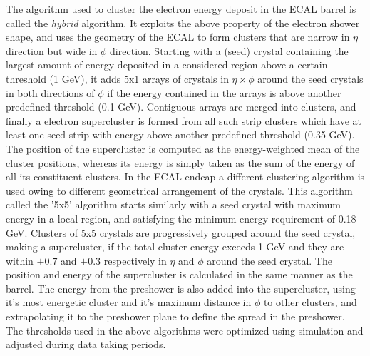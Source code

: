 The algorithm used to cluster the electron energy deposit in the ECAL barrel is called the \textit{hybrid} algorithm. It exploits the above property of the electron shower shape, and uses the geometry of the ECAL to form clusters that are narrow in $\eta$ direction but wide in $\phi$ direction. Starting with a (seed) crystal containing the largest amount of energy deposited in a considered region above a certain threshold (1 GeV), it adds 5x1 arrays of crystals in $\eta\times\phi$ around the seed crystals in both directions of $\phi$ if the energy contained in the arrays is above another predefined threshold (0.1 GeV). Contiguous arrays are merged into clusters, and finally a electron supercluster is formed from all such strip clusters which have at least one seed strip with energy above another predefined threshold (0.35 GeV). The position of the supercluster is computed as the energy-weighted mean of the cluster positions, whereas its energy is simply taken as the sum of the energy of all its constituent clusters. In the ECAL endcap a different clustering algorithm is used owing to different geometrical arrangement of the crystals. This algorithm called the '5x5' algorithm starts similarly with a seed crystal with maximum energy in a local region, and satisfying the minimum energy requirement of 0.18 GeV. Clusters of 5x5 crystals are progressively grouped around the seed crystal, making a supercluster, if the total cluster energy exceeds 1 GeV and they are within $\pm 0.7$  and $\pm 0.3$ respectively in $\eta$ and $\phi$ around the seed crystal. The position and energy of the supercluster is calculated in the same manner as the barrel. The energy from the preshower is also added into the supercluster, using it's most energetic cluster and it's maximum distance in $\phi$ to other clusters, and extrapolating it to the preshower plane to define the spread in the preshower. The thresholds used in the above algorithms were optimized using simulation and adjusted during data taking periods.

